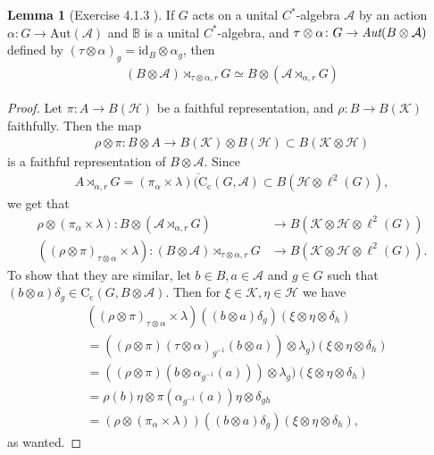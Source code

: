 \documentclass[10pt,oneside,openany,final]{memoir}
\theoremstyle{definition}
\newtheorem{lemma}[theorem]{Lemma}
\theoremstyle{Break}
\newcommand{\A}{\mathcal{A}}
\newcommand{\B}{\mathbb{B}}
\newcommand{\cc}{\text{C}_{\text{c}}}
\renewcommand{\H}{\mathcal{H}}
\begin{document}
\begin{lemma}[Exercise 4.1.3 \text{[BO]}]
If $G$ acts on a unital $C^*$-algebra $\A$ by an action $\alpha \colon G \to \mathrm{Aut}(\A)$ and $\B$ is a unital $C^*$-algebra, and $\tau \otimes \alpha \colon G \to \emph{Aut}(B\otimes \A)$ defined by $(\tau \otimes \alpha)_{g}=\text{id}_{B} \otimes \alpha_{g}$, then 
\begin{align*}
(B \otimes \A) \rtimes_{\tau \otimes \alpha,r}G \simeq B \otimes(\A \rtimes_{\alpha,r}G)
\end{align*}
\begin{proof}
Let $\pi \colon A \to B(\H)$ be a faithful representation, and $\rho \colon B \to B(\mathcal{K})$ faithfully. Then the map 
\begin{align*}
\rho \otimes \pi \colon B \otimes A \to B(\mathcal{K}) \otimes B(\H) \subset B(\mathcal{K} \otimes \H)
\end{align*}
is a faithful representation of $B \otimes \A$. Since 
\begin{align*}
A \rtimes_{\alpha,r}G= \overline{(\pi_{\alpha} \times \lambda)(\cc(G,\A)} \subset B(\H \otimes \ell^2(G)),
\end{align*}
we get that 
\begin{align*}
\rho \otimes (\pi_{\alpha} \times \lambda) \colon B \otimes( \A \rtimes_{\alpha,r}G) &\to B(\mathcal{K} \otimes \H \otimes \ell^2(G))\\
((\rho \otimes \pi)_{\tau \otimes \alpha} \times \lambda) \colon (B \otimes \A) \rtimes_{\tau \otimes \alpha,r}G &\to B(\mathcal{K} \otimes \H \otimes \ell^2(G)).
\end{align*}
To show that they are similar, let $b \in B, a \in \A$ and  $g \in G$ such that $(b \otimes a)\delta_{g} \in \cc(G, B \otimes \A)$. Then for $\xi \in \mathcal{K}, \eta \in \H$ we have
\begin{align*}
&((\rho \otimes \pi)_{\tau \otimes \alpha} \times \lambda)((b \otimes a)\delta_{g})(\xi \otimes \eta \otimes \delta_{h})\\
&=((\rho \otimes \pi)(\tau \otimes \alpha)_{g^{-1}}(b \otimes a))\otimes \lambda_{g})(\xi \otimes \eta \otimes \delta_{h})\\
&=((\rho \otimes \pi)(b \otimes \alpha_{g^{-1}}(a)))\otimes \lambda_{g}) (\xi \otimes \eta \otimes \delta_{h})\\
&= \rho(b)\eta \otimes \pi(\alpha_{g^{-1}}(a)) \eta \otimes \delta_{gh}\\
&= (\rho \otimes(\pi_{\alpha} \times \lambda))((b \otimes a)\delta_{g})(\xi \otimes \eta \otimes \delta_{h}),
\end{align*}
as wanted.
\end{proof}
\end{lemma}
\end{document}
